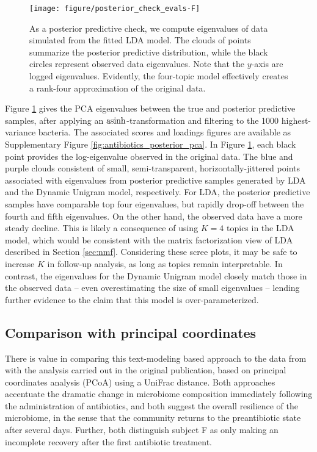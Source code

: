 \documentclass{article}
\begin{document}
\begin{figure}[!p]
  \centering
  \texttt{[image: figure/posterior\_check\_evals-F]}
  \caption{As a posterior predictive check, we compute eigenvalues of data
    simulated from the fitted LDA model. The clouds of points summarize the
    posterior predictive distribution, while the black circles represent
    observed data eigenvalues. Note that the $y$-axis are logged eigenvalues.
    Evidently, the four-topic model effectively creates a rank-four
    approximation of the original data. \label{fig:antibiotics_posterior_evals}}
\end{figure}

Figure \ref{fig:antibiotics_posterior_evals} gives the PCA eigenvalues between
the true and posterior predictive samples, after applying an
$\mathop\mathrm{asinh}$-transformation and filtering to the 1000 highest-variance bacteria. The
associated scores and loadings figures are available as Supplementary Figure
\ref{fig:antibiotics_posterior_pca}. In Figure
\ref{fig:antibiotics_posterior_evals}, each black point provides the
log-eigenvalue observed in the original data. The blue and purple clouds
consistent of small, semi-transparent, horizontally-jittered points associated
with eigenvalues from posterior predictive samples generated by LDA and the
Dynamic Unigram model, respectively. For LDA, the posterior predictive samples
have comparable top four eigenvalues, but rapidly drop-off between the fourth
and fifth eigenvalues. On the other hand, the observed data have a more steady
decline. This is likely a consequence of using $K = 4$ topics in the LDA model,
which would be consistent with the matrix factorization view of LDA described in
Section \ref{sec:nmf}. Considering these scree plots, it may be safe to increase
$K$ in follow-up analysis, as long as topics remain interpretable. In contrast,
the eigenvalues for the Dynamic Unigram model closely match those in the
observed data -- even overestimating the size of small eigenvalues -- lending
further evidence to the claim that this model is over-parameterized.

\subsection{Comparison with principal coordinates}
\label{subsec:comparison_with_pcoa}

There is value in comparing this text-modeling based approach to the data from
\citep{dethlefsen2011incomplete} with the analysis carried out in the original
publication, based on principal coordinates analysis (PCoA) using a UniFrac
distance. Both approaches accentuate the dramatic change in microbiome
composition immediately following the administration of antibiotics, and both
suggest the overall resilience of the microbiome, in the sense that the
community returns to the preantibiotic state after several days. Further, both
distinguish subject F as only making an incomplete recovery after the first
antibiotic treatment.
\end{document}
